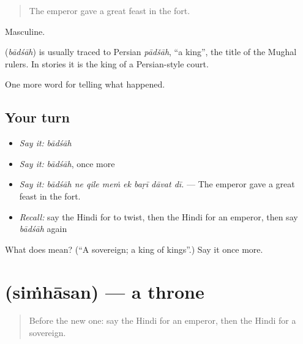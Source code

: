\begin{quote}
The emperor gave a great feast in the fort.
\end{quote}

Masculine.

\begin{cousinweb}
\textbf{} (\emph{bādśāh}) is usually traced to Persian \emph{pādšāh}, \textquotedblleft{}a king\textquotedblright{}, the title of the Mughal rulers. In stories it is the king of a Persian-style court.
\end{cousinweb}

\begin{grammarlens}[title={What you've built}]
One more word for telling what happened.
\end{grammarlens}

\subsection*{Your turn}
\begin{itemize}
\raggedright
  \item \emph{Say it:} \emph{bādśāh}
  \item \emph{Say it:} \emph{bādśāh}, once more
  \item \emph{Say it:} \emph{bādśāh ne qile meṁ ek baṛī dāvat dī.} — The emperor gave a great feast in the fort.
  \item \emph{Recall:} say the Hindi for to twist, then the Hindi for an emperor, then say \emph{bādśāh} again
\end{itemize}

\begin{tcolorbox}[breakable,colback=teal!4,colframe=teal!35!black,title={Before you move on}]
What does  mean? (\textquotedblleft{}A sovereign; a king of kings\textquotedblright{}.) Say it once more.
\end{tcolorbox}
\section[\texorpdfstring{\hi{सिंहासन} (siṁhāsan)}{सिंहासन (siṁhāsan)}]{ (siṁhāsan) — a throne}

\label{lesson:HI-C320-simhasan}



\begin{quote}
Before the new one: say the Hindi for an emperor, then the Hindi for a sovereign.
\end{quote}

